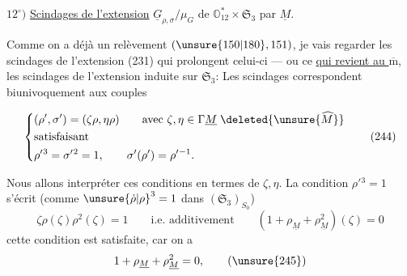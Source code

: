 $12^\circ)$ \uline{Scindages de l'extension}
$\underline G_{\rho,\sigma}/\mu_G$ de
$\mathbb O_{12}^{*}\times\mathfrak S_3$
par $\underline M$.

Comme on a déjà un relèvement
$(\unsure{150|180},151)$, je vais regarder les scindages
de l'extension (231) qui prolongent celui-ci --- ou ce
\uline{qui revient au $\overline{\mathrm m}$}, les scindages
de l'extension induite sur $\mathfrak S_3$:
Les scindages correspondent 
biunivoquement aux couples


\[
\left\{\begin{aligned}
 &(\rho',\sigma')=(\zeta\rho,\eta\rho)
   \qquad\text{avec }\zeta,\eta\in\Gamma\underline M
   \;\deleted{\unsure{\widehat M}}\\
 &\text{satisfaisant}\\
 &\rho'{}^3=\sigma'{}^2=1,\qquad
   \sigma'(\rho')=\rho'{}^{-1}.
\end{aligned}\right.
\tag{244}
\]

Nous allons interpréter ces conditions en termes de $\zeta,\eta$.
La condition $\rho'{}^3=1$ s'écrit
(comme $\unsure{\dot\rho|\rho}^3=1$ dans $(\mathfrak S_3)_{S_0}$)
\[
\zeta\rho(\zeta)\rho^2(\zeta)=1
\qquad\text{i.e. additivement}\qquad
(1+\rho_{\underline M}+\rho_{\underline M}^2)(\zeta)=0
\tag{245}
\]
cette condition est  satisfaite, car on a
\[
1+\rho_{\underline M}+\rho_{\underline M}^2=0,
\tag{\unsure{245}}
\]

